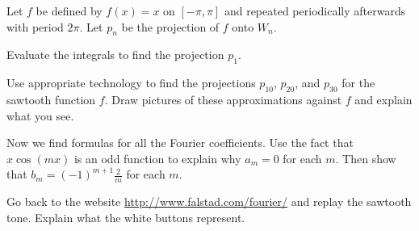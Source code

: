 \begin{pactivity} \label{act:Fourier_sawtooth} Let $f$ be defined by $f(x) = x$ on $[-\pi,\pi]$ and repeated periodically afterwards with period $2\pi$. Let $p_n$ be the projection of $f$ onto $W_n$.
	\ba
	\item Evaluate the integrals to find the projection $p_1$.

	\item  Use appropriate technology to find the projections $p_{10}$, $p_{20}$, and $p_{30}$ for the sawtooth function $f$. Draw pictures of these approximations against $f$ and explain what you see.  	
	
	\item Now we find formulas for all the Fourier coefficients. Use the fact that $x \cos(mx)$ is an odd function to explain why $a_m = 0$ for each $m$. Then show that $b_m = (-1)^{m+1}\frac{2}{m}$ for each $m$.

		
	\item Go back to the website \url{http://www.falstad.com/fourier/} and replay the sawtooth tone. Explain what the white buttons represent. 

	
	\ea
	
\end{pactivity}



